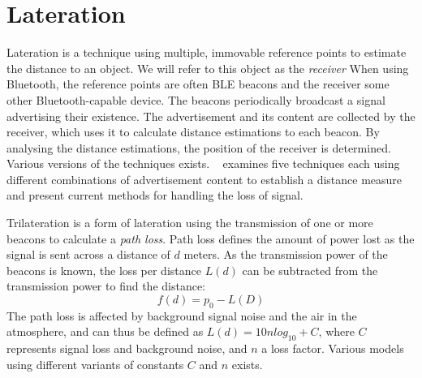 \section{Lateration}
Lateration is a technique using multiple, immovable reference points to estimate the distance to an object\cite{presence_ble_review}.
We will refer to this object as the \textit{receiver}   
When using Bluetooth, the reference points are often BLE beacons and the receiver some other Bluetooth-capable device. 
The beacons periodically broadcast a signal advertising their existence. 
The advertisement and its content are collected by the receiver, which uses it to calculate distance estimations to each beacon. 
By analysing the distance estimations, the position of the receiver is determined.
Various versions of the techniques exists.
\citeauthor{presence_ble_review}~\cite{presence_ble_review} examines five techniques each using different combinations of advertisement content to establish a distance measure and present current methods for handling the loss of signal.

Trilateration is a form of lateration using the transmission of one or more beacons to calculate a \textit{path loss}.
Path loss defines the amount of power lost as the signal is sent across a distance of $d$ meters.
As the transmission power of the beacons is known, the loss per distance $L(d)$ can be subtracted from the transmission power to find the distance:\cite{taking_localization_to_the_wild}
\begin{equation}
    f(d) = p_0 - L(D)
\end{equation}
The path loss is affected by background signal noise and the air in the atmosphere, and can thus be defined as $L(d) = 10n log_10+C$, where $C$ represents signal loss and background noise, and $n$ a loss factor. \cite{presence_ble_review}
Various models using different variants of constants $C$ and $n$ exists\cite{path_loss_models}.